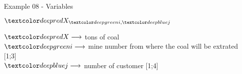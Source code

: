 \begin{frame}{Example 08 - Variables}
\begin{center}
\Huge{
$\colora{X}_{\colorb{i}, \colorc{j}}$
}
\end{center}
\large{
$\colora{X} \longrightarrow$
    tons of coal  \\ \vspace{1cm}
$\colorb{i} \longrightarrow$
    mine number from where the coal will be extrated [1;3] \\ \vspace{1cm}
$\colorc{j} \longrightarrow$
    number of customer [1;4]
}
\end{frame}
